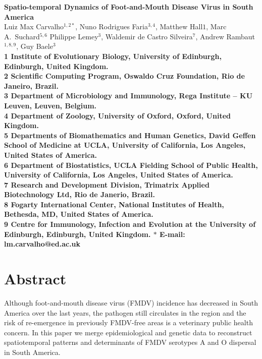 \documentclass[10pt]{article}
\date{}
\begin{document}
\begin{flushleft}
{\Large
\textbf{Spatio-temporal Dynamics of Foot-and-Mouth Disease Virus in South America}
}
\\
Luiz Max Carvalho$^{1,2\ast}$,
Nuno Rodrigues Faria$^{3,4}$,
Matthew Hall${1}$,
Marc A.~Suchard$^{5,6}$
Philippe Lemey$^{3}$,
Waldemir de Castro Silveira$^{7}$,
Andrew Rambaut$^{1,8,9}$,
Guy Baele$^{3}$
\\
\bf{1} Institute of Evolutionary Biology, University of Edinburgh, Edinburgh, United Kingdom.\\
\bf{2} Scientific Computing Program, Oswaldo Cruz Foundation, Rio de Janeiro, Brazil.\\
\bf{3} Department of Microbiology and Immunology, Rega Institute -- KU Leuven, Leuven, Belgium.\\
\bf{4} Department of Zoology, University of Oxford, Oxford, United Kingdom.\\
\bf{5} Departments of Biomathematics and Human Genetics, David Geffen School of Medicine at UCLA, University of California, Los Angeles,  United States of America.\\
\bf{6} Department of Biostatistics, UCLA Fielding School of Public Health, University of California, Los Angeles,  United States of America.\\
\bf{7} Research and Development Division, Trimatrix Applied Biotechnology Ltd, Rio de Janerio, Brazil.\\
\bf{8} Fogarty International Center, National Institutes of Health, Bethesda, MD,  United States of America.\\
\bf{9} Centre for Immunology, Infection and Evolution at the University of Edinburgh, Edinburgh, United Kingdom.
$\ast$ E-mail: lm.carvalho@ed.ac.uk
\end{flushleft}
\section*{Abstract}
Although foot-and-mouth disease virus (FMDV) incidence has decreased in South America over the last years, the pathogen still circulates in the region and the risk of re-emergence in previously FMDV-free areas is a veterinary public health concern.
In this paper we merge epidemiological and genetic data to reconstruct spatiotemporal patterns and determinants of FMDV serotypes A and O dispersal in South America.
\end{document}

